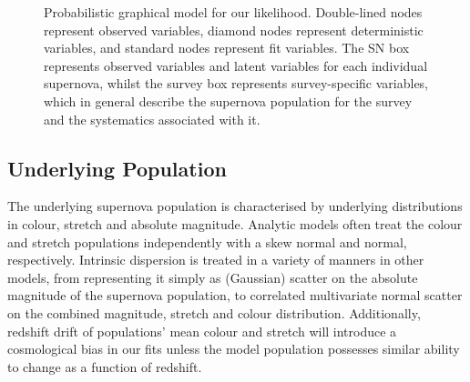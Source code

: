 \documentclass[a4paper,fleqn,usenatbib]{mnras}
\begin{document}
 \begin{figure}
	\caption{Probabilistic graphical model for our likelihood. Double-lined nodes represent observed variables, diamond nodes represent deterministic variables, and standard nodes represent fit variables. The SN box represents observed variables and latent variables for each individual supernova, whilst the survey box represents survey-specific variables, which in general describe the supernova population for the survey and the systematics associated with it.}
	\label{fig:pgm}
 \end{figure}


\subsection{Underlying Population}

The underlying supernova population is characterised by underlying distributions in colour, stretch and absolute magnitude. Analytic models often treat the colour and stretch populations independently with a skew normal and normal, respectively. Intrinsic dispersion is treated in a variety of manners in other models, from representing it simply as (Gaussian) scatter on the absolute magnitude of the supernova population, to correlated multivariate normal scatter on the combined magnitude, stretch and colour distribution. Additionally, redshift drift of populations' mean colour and stretch will introduce a cosmological bias in our fits unless the model population possesses similar ability to change as a function of redshift. 
\end{document}
